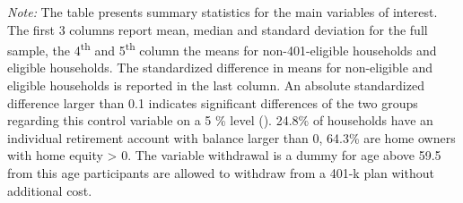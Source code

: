 \begin{tiny}
			\def\sym#1{\ifmmode^{#1}\else\(^{#1}\)\fi}
			\begin{ThreePartTable}
				\begin{TableNotes}
					\begin{scriptsize}
					\item \textit{Note:} The table presents summary statistics for the main variables of interest. The first 3 columns report mean, median and standard deviation for the full sample, the 4\textsuperscript{th} and 5\textsuperscript{th} column the means for non-401-eligible households and eligible households. The standardized difference in means for non-eligible and eligible households is reported in the last column. An absolute standardized difference larger than 0.1 indicates significant differences of the two groups regarding this control variable on a 5 \% level (\cite{standardized_difference}). 24.8\% of households have an individual retirement account with balance larger than 0, 64.3\% are home owners with home equity > 0. The variable withdrawal is a dummy for age above 59.5 \textemdash from this age participants are allowed to withdraw from a 401-k plan without additional cost.
					\end{scriptsize}
				\end{TableNotes}
				

\end{ThreePartTable}
\end{tiny}
